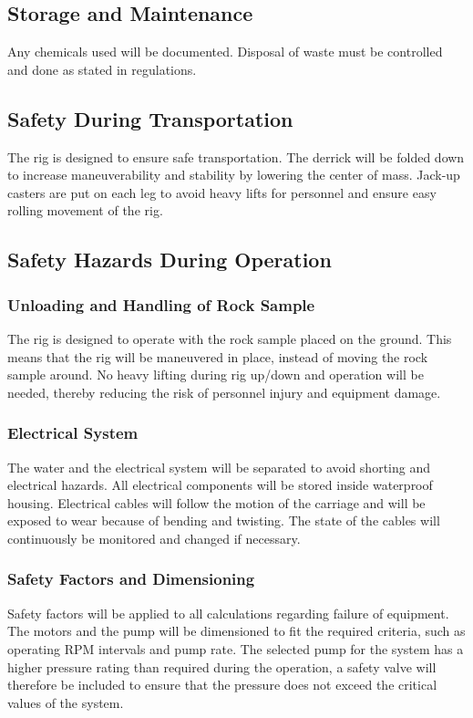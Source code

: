 \subsection{Storage and Maintenance}
Any chemicals used will be documented. Disposal of waste must be controlled and done as stated in regulations.


\subsection{Safety During Transportation}
The rig is designed to ensure safe transportation. The derrick will be folded down to increase maneuverability and stability by lowering the center of mass. Jack-up casters are put on each leg to avoid heavy lifts for personnel and ensure easy rolling movement of the rig. 


\subsection{Safety Hazards During Operation}
\subsubsection{Unloading and Handling of Rock Sample}
The rig is designed to operate with the rock sample placed on the ground. This means that the rig will be maneuvered in place, instead of moving the rock sample around. No heavy lifting during rig up/down and operation will be needed, thereby reducing the risk of personnel injury and equipment damage.  


\subsubsection{Electrical System}
The water and the electrical system will be separated to avoid shorting and electrical hazards. All electrical components will be stored inside waterproof housing. Electrical cables will follow the motion of the carriage and will be exposed to wear because of bending and twisting. The state of the cables will continuously be monitored and changed if necessary. 


\subsubsection{Safety Factors and Dimensioning}
Safety factors will be applied to all calculations regarding failure of equipment. The motors and the pump will be dimensioned to fit the required criteria, such as operating RPM intervals and pump rate. The selected pump for the system has a higher pressure rating than required during the operation, a safety valve will therefore be included to ensure that the pressure does not exceed the critical values of the system. 


